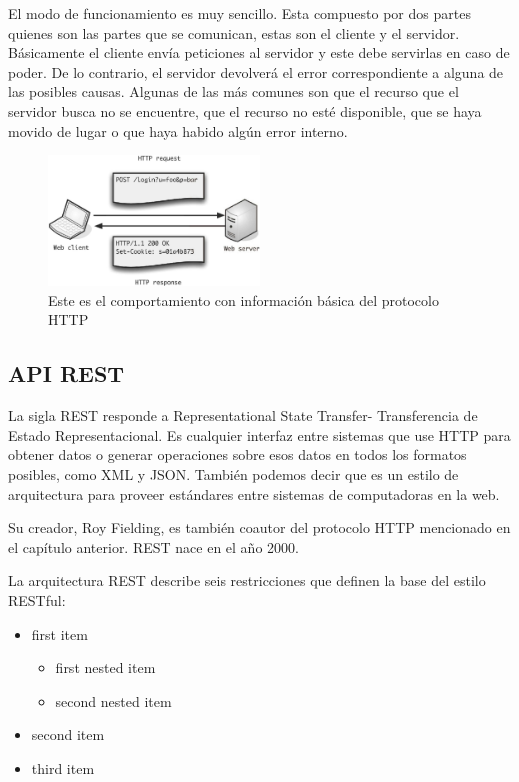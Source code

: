El modo de funcionamiento es muy sencillo. Esta compuesto por dos partes quienes son 
las partes que se comunican, estas son el cliente y el servidor. Básicamente el cliente
envía peticiones al servidor y este debe servirlas en caso de poder. De lo contrario, 
el servidor devolverá el error correspondiente a alguna de las posibles causas. Algunas 
de las más comunes son que el recurso que el servidor busca no se encuentre, que el 
recurso no esté disponible, que se haya movido de lugar o que haya habido algún error 
interno.

\begin{figure}[htbp!] 
\centering    
\includegraphics[width=0.5\textwidth]{http1}
\caption[HTTP]{Este es el comportamiento con información básica del protocolo HTTP}
\label{fig:http-behavior}
\end{figure}


\subsection{API REST}

La sigla REST responde a Representational State Transfer- Transferencia de Estado
Representacional. Es cualquier interfaz entre sistemas que use HTTP para obtener
datos o generar operaciones sobre esos datos en todos los formatos posibles, como XML y
JSON. También podemos decir que es un estilo de arquitectura para proveer estándares entre
sistemas de computadoras en la web. 

Su creador, Roy Fielding, es también coautor del protocolo HTTP mencionado en el capítulo 
anterior. REST nace en el año 2000.

La arquitectura REST describe seis restricciones que definen la base del estilo 
RESTful:

\begin{itemize}
   \item first item
   \begin{itemize}
     \item first nested item
     \item second nested item
   \end{itemize}
   \item second item
   \item third item
\end{itemize}


